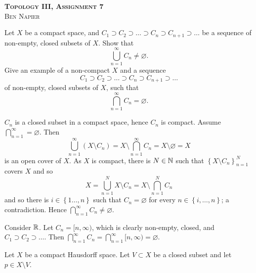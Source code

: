 \documentclass[a4paper, answers]{exam}
\begin{document}
\begin{center}
	\textbf{\textsc{Topology III, Assignment 7}}
	\\
	\textsc{Ben Napier}
	\vspace{1em}
\end{center}

\begin{questions}
	\question Let $X$ be a compact space, and
	$C_1 \supset C_2 \supset \ldots \supset C_n \supset C_{n+1} \supset \ldots$
	be a sequence of non-empty, closed subsets of $X$.
	Show that
	\[
		\bigcup_{n=1}^\infty C_n \neq \varnothing.
	\]
	Give an example of a non-compact $X$ and a sequence
	\[
		C_1 \supset C_2 \supset \ldots \supset C_n \supset C_{n+1} \supset
		\ldots
	\]
	of non-empty, closed subsets of $X$, such that
	\[
		\bigcap_{n=1}^\infty C_n = \varnothing.
	\]
	\begin{solution}
		$C_n$ is a closed subset in a compact space, hence $C_n$ is compact.
		Assume $\bigcap_{n=1}^\infty = \varnothing$.
		Then
		\[
			\bigcup_{n=1}^\infty 
			\left( 
				X \setminus C_n 
			\right)
			= X \setminus \bigcap_{n=1}^\infty C_n
			= X \setminus \varnothing
			= X
		\]
		is an open cover of $X$.
		As $X$ is compact, there is $N \in \mathbb{N}$ such that
		$
			\left\{
				X \setminus C_n
			\right\}_{n=1}^N
		$
		covers $X$ and so
		\[
			X
			= \bigcup_{n=1}^N X \setminus C_n
			= X \setminus \bigcap_{n=1}^N C_n
		\]
		and so there is
		$
			i \in \left\{
				1 \ldots, n
			\right\}
		$
		such that $C_n = \varnothing$
		for every
		$
			n \in \left\{
				i, \ldots, n
			\right\}
		$;
		a contradiction.
		Hence $\bigcap_{n=1}^\infty C_n \neq \varnothing$.

		Consider $\mathbb{R}$.
		Let $C_n = [n, \infty)$, which is clearly non-empty, closed,
		and $C_1 \supset C_2 \supset \ldots$.
		Then
		$
			\bigcap_{n=1}^\infty C_n
			= \bigcap_{n=1}^\infty [n, \infty)
			= \varnothing
		$.
	\end{solution}

	\question Let $X$ be a compact Hausdorff space.
	Let $V \subset X$ be a closed subset and let $p \in X \setminus V$.
	\begin{parts}

\end{parts}
\end{questions}
\end{document}
